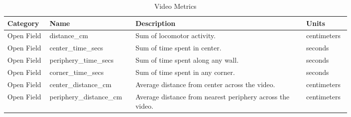 \documentclass[11pt,reqno]{amsart}
\begin{document}
\begin{table}
\caption {Video Metrics}  
\footnotesize
\centering
\begin{tabular}{p{0.1\linewidth} | p{0.18\linewidth}| p{0.45\linewidth}| p{0.08\linewidth}}
\hline
Category         & Name                     & Description               & Units               \\
\hline
Open Field  & distance\_cm             & Sum of locomotor activity.                                                                                                                                                                                                                                                              & centimeters         \\[.3cm]
Open Field  & center\_time\_secs       & Sum of time spent in center.                                                                                                                                                                                                                                                            & seconds             \\[.3cm]
Open Field  & periphery\_time\_secs    & Sum of time spent along any wall.                                                                                                                                                                                                                                                       & seconds             \\[.3cm]
Open Field  & corner\_time\_secs       & Sum of time spent in any corner.                                                                                                                                                                                                                                                        & seconds             \\[.3cm]
Open Field & center\_distance\_cm     & Average distance from center across the video.                                                                                                                                                                                                                                          & centimeters         \\[.3cm]
Open Field & periphery\_distance\_cm  & Average distance from nearest periphery across the video.                                                                                                                                                                                                                               & centimeters         \\[.3cm]

\end{tabular}
\end{table}
\end{document}
